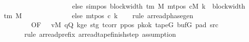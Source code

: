 \begin{isabellebody}
\ \ \ \ \ \ \ \ \ \ \ \ \ \ \ \ \ \ \ \ else\ sim{\isacharunderscore}{\kern0pt}pos\ {\isacharparenleft}{\kern0pt}block{\isacharunderscore}{\kern0pt}width\ {\isacharparenleft}{\kern0pt}{\isasymGamma}{\isacharunderscore}{\kern0pt}tm\ M{\isacharparenright}{\kern0pt}{\isacharparenright}{\kern0pt}\ {\isacharparenleft}{\kern0pt}mt{\isacharunderscore}{\kern0pt}pos\ cM\ k{\isacharparenright}{\kern0pt}\ {\isacharplus}{\kern0pt}\ block{\isacharunderscore}{\kern0pt}width\ {\isacharparenleft}{\kern0pt}{\isasymGamma}{\isacharunderscore}{\kern0pt}tm\ M{\isacharparenright}{\kern0pt}{\isacharparenright}{\kern0pt}\isanewline
\ \ \ \ \ \ \ \ \ \ \ \ \ \ else\ mt{\isacharunderscore}{\kern0pt}pos\ c{}\ k{\isacharparenright}{\kern0pt}{\isachardoublequoteclose}\isanewline
%
\isadelimproof
\ \ %
\endisadelimproof
%
\isatagproof
{}\isamarkupfalse%
\ {\isacharparenleft}{\kern0pt}rule\ ar{\isacharunderscore}{\kern0pt}read{\isacharunderscore}{\kern0pt}phase{\isacharunderscore}{\kern0pt}gen\isanewline
\ \ \ \ \ \ \ \ {\isacharbrackleft}{\kern0pt}OF\ {\isacharunderscore}{\kern0pt}\ {\isacharunderscore}{\kern0pt}\ vM\ qQ\ kge{}\ stg{}\ tcorr\ ppos\ pkok\ tapeG\ bufG\ pad{}\ src{}{\isacharbrackright}{\kern0pt}{\isacharsemicolon}{\kern0pt}\isanewline
\ \ \ \ \ \ {\isacharparenleft}{\kern0pt}rule\ ar{\isacharunderscore}{\kern0pt}read{\isacharunderscore}{\kern0pt}prefix\ ar{\isacharunderscore}{\kern0pt}read{\isacharunderscore}{\kern0pt}tape{\isacharunderscore}{\kern0pt}finish{\isacharunderscore}{\kern0pt}step{\isacharsemicolon}{\kern0pt}\ assumption{\isacharparenright}{\kern0pt}{\isacharparenright}{\kern0pt}%
\endisatagproof
{\isafoldproof}%
%
\isadelimproof
\isanewline
%
\endisadelimproof
%
\isadelimtheory
\isanewline
%
\endisadelimtheory
%
\isatagtheory
{}\isamarkupfalse%
%
\endisatagtheory
{\isafoldtheory}%
%
\isadelimtheory
%
\endisadelimtheory
%
\end{isabellebody}%
\endinput
